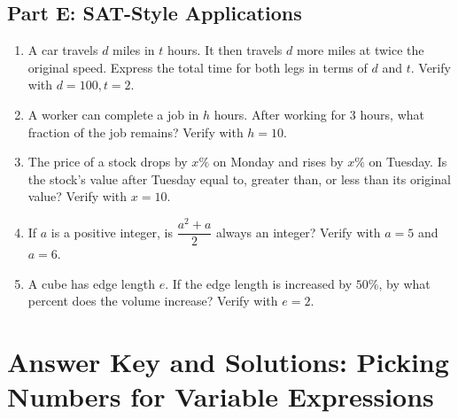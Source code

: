 \documentclass[14pt]{extarticle}
\begin{document}
\subsection*{Part E: SAT-Style Applications}
\begin{enumerate}
  \item A car travels \(d\) miles in \(t\) hours. It then travels \(d\) more miles at twice the original speed. Express the total time for both legs in terms of \(d\) and \(t\). Verify with \(d = 100, t = 2\).
  \item A worker can complete a job in \(h\) hours. After working for 3 hours, what fraction of the job remains? Verify with \(h = 10\).
  \item The price of a stock drops by \(x\%\) on Monday and rises by \(x\%\) on Tuesday. Is the stock's value after Tuesday equal to, greater than, or less than its original value? Verify with \(x = 10\).
  \item If \(a\) is a positive integer, is \(\dfrac{a^2 + a}{2}\) always an integer? Verify with \(a = 5\) and \(a = 6\).
  \item A cube has edge length \(e\). If the edge length is increased by \(50\%\), by what percent does the volume increase? Verify with \(e = 2\).
\end{enumerate}

\newpage

\section*{Answer Key and Solutions: Picking Numbers for Variable Expressions}
\end{document}
